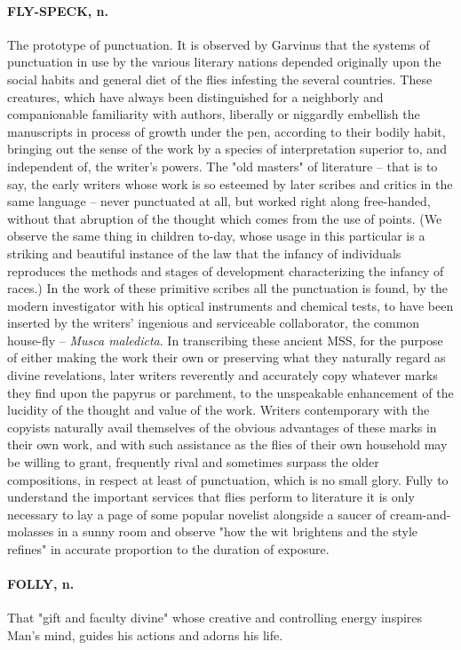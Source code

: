 \documentclass[11pt]{article}
\begin{document}
\paragraph{FLY-SPECK, n.}  The prototype of punctuation.  It is observed by
Garvinus that the systems of punctuation in use by the various
literary nations depended originally upon the social habits and
general diet of the flies infesting the several countries.  These
creatures, which have always been distinguished for a neighborly and
companionable familiarity with authors, liberally or niggardly
embellish the manuscripts in process of growth under the pen,
according to their bodily habit, bringing out the sense of the work by
a species of interpretation superior to, and independent of, the
writer's powers.  The "old masters" of literature -- that is to say,
the early writers whose work is so esteemed by later scribes and
critics in the same language -- never punctuated at all, but worked
right along free-handed, without that abruption of the thought which
comes from the use of points.  (We observe the same thing in children
to-day, whose usage in this particular is a striking and beautiful
instance of the law that the infancy of individuals reproduces the
methods and stages of development characterizing the infancy of
races.)  In the work of these primitive scribes all the punctuation is
found, by the modern investigator with his optical instruments and
chemical tests, to have been inserted by the writers' ingenious and
serviceable collaborator, the common house-fly -- {\em Musca maledicta}.
In transcribing these ancient MSS, for the purpose of either making
the work their own or preserving what they naturally regard as divine
revelations, later writers reverently and accurately copy whatever
marks they find upon the papyrus or parchment, to the unspeakable
enhancement of the lucidity of the thought and value of the work.
Writers contemporary with the copyists naturally avail themselves of
the obvious advantages of these marks in their own work, and with such
assistance as the flies of their own household may be willing to
grant, frequently rival and sometimes surpass the older compositions,
in respect at least of punctuation, which is no small glory.  Fully to
understand the important services that flies perform to literature it
is only necessary to lay a page of some popular novelist alongside a
saucer of cream-and-molasses in a sunny room and observe "how the wit
brightens and the style refines" in accurate proportion to the
duration of exposure.

\paragraph{FOLLY, n.}  That "gift and faculty divine" whose creative and
controlling energy inspires Man's mind, guides his actions and adorns
his life.
\end{document}
